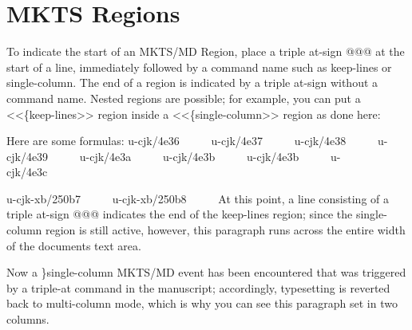\section{MKTS Regions 
}
\begin{multicols}{2}To indicate the start of an {\mktsStyleBold{}MKTS/MD} Region, place a triple at-sign {\mktsStyleCode{}@@@}
at the start of a line, immediately followed by a command name such as
{\mktsStyleCode{}keep-lines} or {\mktsStyleCode{}single-column}. The end of a region is indicated by a
triple at-sign without a command name. Nested regions are possible; for example,
you can put a {\mktsStyleCode{}<<\{keep-lines>>} region inside a {\mktsStyleCode{}<<\{single-column>>} region as
done here:\mktsShowpar\par
\end{multicols}
Here are some formulas:
\begingroup\obeyalllines{}
{\mktsStyleCode{}u-cjk/4e36}     
{\mktsStyleCode{}u-cjk/4e37}     
{\mktsStyleCode{}u-cjk/4e38}     
{\mktsStyleCode{}u-cjk/4e39}     
{\mktsStyleCode{}u-cjk/4e3a}     
{\mktsStyleCode{}u-cjk/4e3b}     
{\mktsStyleCode{}u-cjk/4e3b}     
{\mktsStyleCode{}u-cjk/4e3c}     

{\mktsStyleCode{}u-cjk-xb/250b7}     
{\mktsStyleCode{}u-cjk-xb/250b8}     
\endgroup{}
At this point, a line consisting of a triple at-sign {\mktsStyleCode{}@@@}
indicates the end of the {\mktsStyleCode{}keep-lines} region; since the
{\mktsStyleCode{}single-column} region is still active, however, {\mktsStyleItalic{}this
paragraph runs across the entire width\/} of the documents text
area.
\begin{multicols}{2}
Now a {\mktsStyleCode{}\}single-column} {\mktsStyleBold{}MKTS/MD} event has been encountered
that was triggered by a triple-at command in the manuscript;
accordingly, typesetting is reverted back to multi-column mode,
which is why you can see this paragraph set in two columns.\mktsShowpar\par
\end{multicols}
